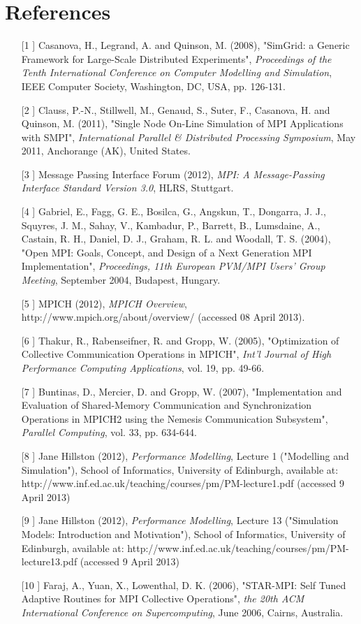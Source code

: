 \documentclass[a4paper]{article}
\begin{document}
\section{References}
\begin{enumerate}
\item[[1]] Casanova, H., Legrand, A. and Quinson, M. (2008),
  "SimGrid: a Generic Framework for Large-Scale Distributed
  Experiments", \emph{Proceedings of the Tenth International Conference on
    Computer Modelling and Simulation}, IEEE Computer Society,
  Washington, DC, USA, pp. 126-131.
\item[[2]] Clauss, P.-N., Stillwell, M., Genaud, S., Suter, F.,
  Casanova, H. and Quinson, M. (2011), "Single Node On-Line Simulation
  of MPI Applications with SMPI", \emph{International Parallel \&
    Distributed Processing Symposium}, May 2011, Anchorange (AK),
  United States.
\item[[3]] Message Passing Interface Forum (2012), \emph{MPI: A Message-Passing Interface Standard
  Version 3.0}, HLRS, Stuttgart.
\item[[4]] Gabriel, E., Fagg, G. E., Bosilca, G., Angskun, T.,
  Dongarra, J. J., Squyres, J. M., Sahay, V., Kambadur, P., Barrett,
  B., Lumsdaine, A., Castain, R. H., Daniel, D. J., Graham, R. L. and
  Woodall, T. S. (2004), "Open MPI: Goals, Concept, and Design of a
  Next Generation MPI Implementation", \emph{Proceedings, 11th
    European PVM/MPI Users' Group Meeting}, September 2004, Budapest,
  Hungary.
\item[[5]] MPICH (2012), \emph{MPICH Overview},
  http://www.mpich.org/about/overview/ (accessed 08 April 2013).
\item[[6]] Thakur, R., Rabenseifner, R. and Gropp, W. (2005), "Optimization
  of Collective Communication Operations in MPICH", \emph{Int’l
    Journal of High Performance Computing Applications}, vol. 19,
  pp. 49-66.
\item[[7]] Buntinas, D., Mercier, D. and Gropp, W. (2007),
  "Implementation and Evaluation of Shared-Memory Communication and
  Synchronization Operations in MPICH2 using the Nemesis Communication
  Subsystem", \emph{Parallel Computing}, vol. 33, pp. 634-644.
\item[[8]] Jane Hillston (2012), \emph{Performance Modelling}, Lecture
  1 ("Modelling and Simulation"), School of Informatics, University of
  Edinburgh, available at:
  http://www.inf.ed.ac.uk/teaching/courses/pm/PM-lecture1.pdf
  (accessed 9 April 2013)
\item[[9]] Jane Hillston (2012), \emph{Performance Modelling}, Lecture
  13 ("Simulation Models: Introduction and Motivation"), School of
  Informatics, University of Edinburgh, available at:
  http://www.inf.ed.ac.uk/teaching/courses/pm/PM-lecture13.pdf
  (accessed 9 April 2013)
\item[[10]] Faraj, A., Yuan, X., Lowenthal, D. K. (2006), "STAR-MPI:
  Self Tuned Adaptive Routines for MPI Collective Operations",
  \emph{the 20th ACM International Conference on Supercomputing},
  June 2006, Cairns, Australia.
\end{enumerate}
\end{document}
